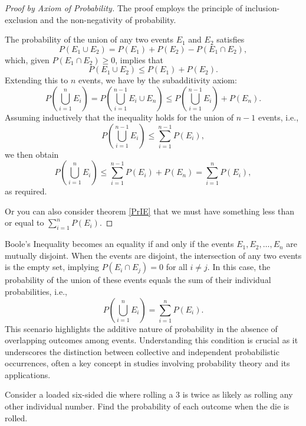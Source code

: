         \begin{proof}[Proof by Axiom of Probability]
            The proof employs the principle of inclusion-exclusion and the non-negativity of probability.
        
            The probability of the union of any two events \( E_1 \) and \( E_2 \) satisfies
            \[
                P(E_1 \cup E_2) = P(E_1) + P(E_2) - P(E_1 \cap E_2),
            \]
            which, given \( P(E_1 \cap E_2) \geq 0 \), implies that
            \[
                P(E_1 \cup E_2) \leq P(E_1) + P(E_2).
            \]
            Extending this to \( n \) events, we have by the subadditivity axiom:
            \[
                P\left(\bigcup_{i=1}^n E_i\right) = P\left(\bigcup_{i=1}^{n-1} E_i \cup E_n\right) \leq P\left(\bigcup_{i=1}^{n-1} E_i\right) + P(E_n).
            \]
            Assuming inductively that the inequality holds for the union of \( n-1 \) events, i.e.,
            \[
                P\left(\bigcup_{i=1}^{n-1} E_i\right) \leq \sum_{i=1}^{n-1} P(E_i),
            \]
            we then obtain
            \[
                P\left(\bigcup_{i=1}^n E_i\right) \leq \sum_{i=1}^{n-1} P(E_i) + P(E_n) = \sum_{i=1}^n P(E_i),
            \]
            as required.
            
            Or you can also consider theorem \ref{PrIE} that we must have something less than or equal to $\sum_{i=1}^{n}P(E_i)$.
        \end{proof}
        \begin{remark}
            Boole's Inequality becomes an equality if and only if the events \(E_1, E_2, \ldots, E_n\) are mutually disjoint. When the events are disjoint, the intersection of any two events is the empty set, implying \(P(E_i \cap E_j) = 0\) for all \(i \neq j\). In this case, the probability of the union of these events equals the sum of their individual probabilities, i.e.,
            \[
                P\left(\bigcup_{i=1}^n E_i\right) = \sum_{i=1}^n P(E_i).
            \]
            This scenario highlights the additive nature of probability in the absence of overlapping outcomes among events. Understanding this condition is crucial as it underscores the distinction between collective and independent probabilistic occurrences, often a key concept in studies involving probability theory and its applications.
        \end{remark}

        \begin{exercise}
            Consider a loaded six-sided die where rolling a 3 is twice as likely as rolling any other individual number. Find the probability of each outcome when the die is rolled.
        \end{exercise}
        
